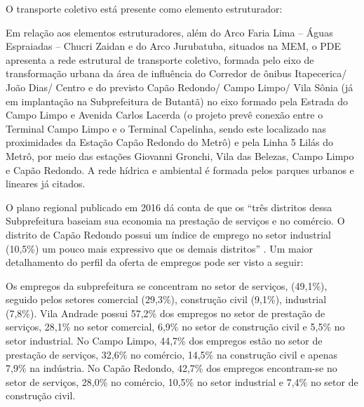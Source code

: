 	O transporte coletivo está presente como elemento estruturador:
	
	\begin{citacao}
		Em relação aos elementos estruturadores, além do Arco Faria Lima – Águas Espraiadas – Chucri Zaidan e do Arco Jurubatuba, situados na MEM, o PDE apresenta a rede estrutural de transporte coletivo, formada pelo eixo de transformação urbana da área de influência do Corredor de ônibus Itapecerica/ João Dias/ Centro e do previsto Capão Redondo/ Campo Limpo/ Vila Sônia (já em implantação na Subprefeitura de Butantã) no eixo formado pela Estrada do Campo Limpo e Avenida Carlos Lacerda (o projeto prevê conexão entre o Terminal Campo Limpo e o Terminal Capelinha, sendo este localizado nas proximidades da Estação Capão Redondo do Metrô) e pela Linha 5 Lilás do Metrô, por meio das estações Giovanni Gronchi, Vila das Belezas, Campo Limpo e Capão Redondo. A rede hídrica e ambiental é formada pelos parques urbanos e lineares já citados.
		\cite[pág. 63]{planosul2}
	\end{citacao}
	
	O plano regional publicado em 2016 dá conta de que os ``três distritos dessa Subprefeitura baseiam sua economia na prestação de serviços e no comércio. O distrito de Capão Redondo possui um índice de emprego no setor industrial (10,5\%) um pouco mais expressivo que os demais distritos'' \cite[pág. 64]{planosul2}. Um maior detalhamento do perfil da oferta de empregos pode ser visto a seguir:
	
	\begin{citacao}
		Os empregos da subprefeitura se concentram no setor de serviços, (49,1\%), seguido pelos setores comercial (29,3\%), construção civil (9,1\%), industrial (7,8\%). Vila Andrade possui 57,2\% dos empregos no setor de prestação de serviços, 28,1\% no setor comercial, 6,9\% no setor de construção civil e 5,5\% no setor industrial. No Campo Limpo, 44,7\% dos empregos estão no setor de prestação de serviços, 32,6\% no comércio, 14,5\% na construção civil e apenas 7,9\% na indústria. No Capão Redondo, 42,7\% dos empregos encontram-se no setor de serviços, 28,0\% no comércio, 10,5\% no setor industrial e 7,4\% no setor de construção civil. \cite[pág. 64]{planosul2}
	\end{citacao}
	
